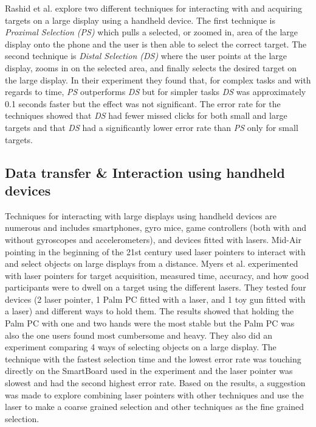 Rashid et al. \cite{Rashid:2011} explore two different techniques for interacting with and acquiring targets on a large display using a handheld device.
The first technique is \emph{Proximal Selection (PS)} which pulls a selected, or zoomed in, area of the large display onto the phone and the user is then able to select the correct target.
The second technique is \emph{Distal Selection (DS)} where the user points at the large display, zooms in on the selected area, and finally selects the desired target on the large display.
In their experiment they found that, for complex tasks and with regards to time, \emph{PS} outperforms \emph{DS} but for simpler tasks \emph{DS} was approximately 0.1 seconds faster but the effect was not significant.
The error rate for the techniques showed that \emph{DS} had fewer missed clicks for both small and large targets and that \emph{DS} had a significantly lower error rate than \emph{PS} only for small targets.

\subsection{Data transfer \& Interaction using handheld devices} \label{sec:targetAcquisition}
Techniques for interacting with large displays using handheld devices are numerous and includes smartphones, gyro mice, game controllers (both with and without gyroscopes and accelerometers), and devices fitted with lasers.
Mid-Air pointing in the beginning of the 21st century used laser pointers to interact with and select objects on large displays from a distance. 
Myers et al. \cite{Myers:2002} experimented with laser pointers for target acquisition, measured time, accuracy, and how good participants were to dwell on a target using the different lasers.
They tested four devices (2 laser pointer, 1 Palm PC fitted with a laser, and 1 toy gun fitted with a laser) and different ways to hold them. 
The results showed that holding the Palm PC with one and two hands were the most stable but the Palm PC was also the one users found most cumbersome and heavy. 
They also did an experiment comparing 4 ways of selecting objects on a large display.
The technique with the fastest selection time and the lowest error rate was touching directly on the SmartBoard used in the experiment and the laser pointer was slowest and had the second highest error rate.
Based on the results, a suggestion was made to explore combining laser pointers with other techniques and use the laser to make a coarse grained selection and other techniques as the fine grained selection.

